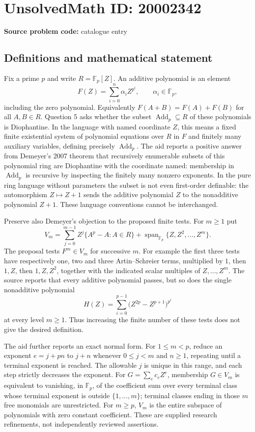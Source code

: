 \documentclass[11pt]{article}
\newcommand{\F}{\mathbb{F}}
\begin{document}
\section*{UnsolvedMath ID: 20002342}
\textbf{Source problem code:} catalogue entry
\subsection{Definitions and mathematical statement}
Fix a prime $p$ and write $R=\F_p[Z]$. An additive polynomial is an element
\[
 F(Z)=\sum_{i=0}^n\alpha_i Z^{p^i},\qquad \alpha_i\in\F_p,
\]
including the zero polynomial. Equivalently $F(A+B)=F(A)+F(B)$ for all $A,B\in R$. Question 5 asks whether the subset $\operatorname{Add}_p\subseteq R$ of these polynomials is Diophantine. In the language with named coordinate $Z$, this means a fixed finite existential system of polynomial equations over $R$ in $F$ and finitely many auxiliary variables, defining precisely $\operatorname{Add}_p$. The aid reports a positive answer from Demeyer's 2007 theorem that recursively enumerable subsets of this polynomial ring are Diophantine with the coordinate named: membership in $\operatorname{Add}_p$ is recursive by inspecting the finitely many nonzero exponents. In the pure ring language without parameters the subset is not even first-order definable: the automorphism $Z\mapsto Z+1$ sends the additive polynomial $Z$ to the nonadditive polynomial $Z+1$. These language conventions cannot be interchanged.

Preserve also Demeyer's objection to the proposed finite tests. For $m\ge1$ put
\[
 V_m=\sum_{j=0}^{m-1} Z^j\{A^p-A:A\in R\}
       +\operatorname{span}_{\F_p}\{Z,Z^2,\ldots,Z^m\}.
\]
The proposal tests $F^m\in V_m$ for successive $m$. For example the first three tests have respectively one, two and three Artin--Schreier terms, multiplied by $1$, then $1,Z$, then $1,Z,Z^2$, together with the indicated scalar multiples of $Z,\ldots,Z^m$. The source reports that every additive polynomial passes, but so does the single nonadditive polynomial
\[
 H(Z)=\sum_{i=0}^{p-1}\bigl(Z^{2p}-Z^{p+1}\bigr)^{p^i}
\]
at every level $m\ge1$. Thus increasing the finite number of these tests does not give the desired definition.

The aid further reports an exact normal form. For $1\le m<p$, reduce an exponent $e=j+pn$ to $j+n$ whenever $0\le j<m$ and $n\ge1$, repeating until a terminal exponent is reached. The allowable $j$ is unique in this range, and each step strictly decreases the exponent. For $G=\sum_e c_eZ^e$, membership $G\in V_m$ is equivalent to vanishing, in $\F_p$, of the coefficient sum over every terminal class whose terminal exponent is outside $\{1,\ldots,m\}$; terminal classes ending in those $m$ free monomials are unrestricted. For $m\ge p$, $V_m$ is the entire subspace of polynomials with zero constant coefficient. These are supplied research refinements, not independently reviewed assertions.
\end{document}
